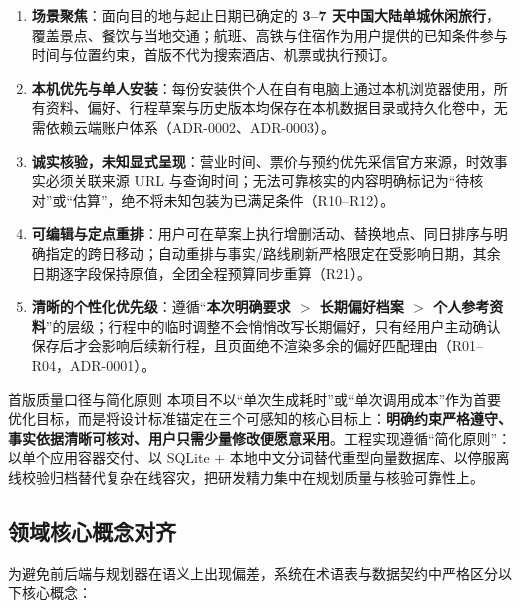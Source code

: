 \begin{enumerate}
  \item \textbf{场景聚焦}：面向目的地与起止日期已确定的 \textbf{3--7 天中国大陆单城休闲旅行}，覆盖景点、餐饮与当地交通；航班、高铁与住宿作为用户提供的已知条件参与时间与位置约束，首版不代为搜索酒店、机票或执行预订。
  \item \textbf{本机优先与单人安装}：每份安装供个人在自有电脑上通过本机浏览器使用，所有资料、偏好、行程草案与历史版本均保存在本机数据目录或持久化卷中，无需依赖云端账户体系（ADR-0002、ADR-0003）。
  \item \textbf{诚实核验，未知显式呈现}：营业时间、票价与预约优先采信官方来源，时效事实必须关联来源 URL 与查询时间；无法可靠核实的内容明确标记为“待核对”或“估算”，绝不将未知包装为已满足条件（R10--R12）。
  \item \textbf{可编辑与定点重排}：用户可在草案上执行增删活动、替换地点、同日排序与明确指定的跨日移动；自动重排与事实/路线刷新严格限定在受影响日期，其余日期逐字段保持原值，全团全程预算同步重算（R21）。
  \item \textbf{清晰的个性化优先级}：遵循“\textbf{本次明确要求 $>$ 长期偏好档案 $>$ 个人参考资料}”的层级；行程中的临时调整不会悄悄改写长期偏好，只有经用户主动确认保存后才会影响后续新行程，且页面绝不渲染多余的偏好匹配理由（R01--R04，ADR-0001）。
\end{enumerate}

\begin{summarybox}{首版质量口径与简化原则}
  本项目不以“单次生成耗时”或“单次调用成本”作为首要优化目标，而是将设计标准锚定在三个可感知的核心目标上：\textbf{明确约束严格遵守、事实依据清晰可核对、用户只需少量修改便愿意采用}。工程实现遵循“简化原则”：以单个应用容器交付、以 SQLite + 本地中文分词替代重型向量数据库、以停服离线校验归档替代复杂在线容灾，把研发精力集中在规划质量与核验可靠性上。
\end{summarybox}

\subsection{领域核心概念对齐}

为避免前后端与规划器在语义上出现偏差，系统在术语表与数据契约中严格区分以下核心概念：

